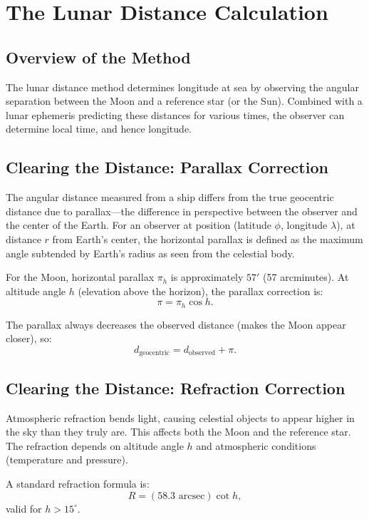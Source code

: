 \section{The Lunar Distance Calculation}

\subsection*{Overview of the Method}

The lunar distance method determines longitude at sea by observing the angular separation between the Moon and a reference star (or the Sun). Combined with a lunar ephemeris predicting these distances for various times, the observer can determine local time, and hence longitude.

\subsection*{Clearing the Distance: Parallax Correction}

The angular distance measured from a ship differs from the true geocentric distance due to parallax—the difference in perspective between the observer and the center of the Earth. For an observer at position (latitude $\phi$, longitude $\lambda$), at distance $r$ from Earth's center, the horizontal parallax is defined as the maximum angle subtended by Earth's radius as seen from the celestial body.

For the Moon, horizontal parallax $\pi_h$ is approximately $57'$ (57 arcminutes). At altitude angle $h$ (elevation above the horizon), the parallax correction is:
\[
  \pi = \pi_h \cos h.
\]

The parallax always decreases the observed distance (makes the Moon appear closer), so:
\[
  d_{\text{geocentric}} = d_{\text{observed}} + \pi.
\]

\subsection*{Clearing the Distance: Refraction Correction}

Atmospheric refraction bends light, causing celestial objects to appear higher in the sky than they truly are. This affects both the Moon and the reference star. The refraction depends on altitude angle $h$ and atmospheric conditions (temperature and pressure).

A standard refraction formula is:
\[
  R = \left(58.3 \text{ arcsec}\right) \cot h,
\]
valid for $h > 15^{\circ}$.

